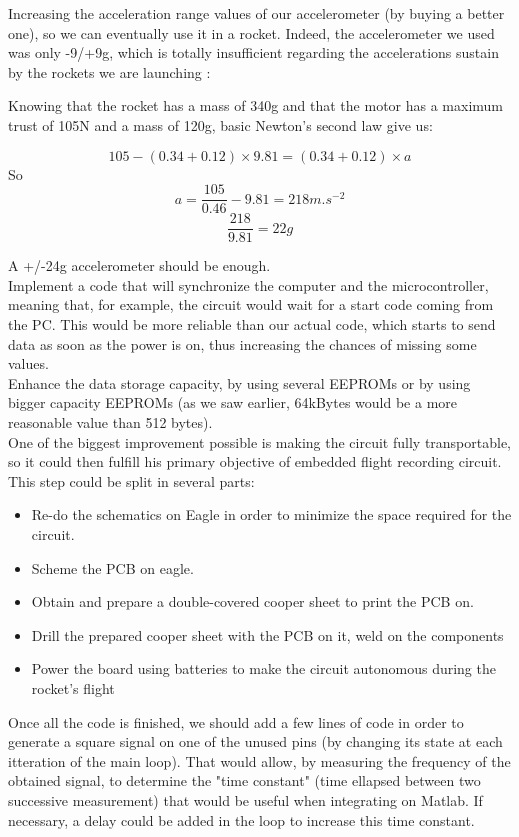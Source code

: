 \documentclass[12pt]{article}
\begin{document}
	Increasing the acceleration range values of our accelerometer (by buying a better one), so we can eventually use it in a rocket. Indeed, the accelerometer we used was only -9/+9g, which is totally insufficient regarding the accelerations sustain by the rockets we are launching :

	Knowing that the rocket has a mass of 340g and that the motor has a maximum trust of 105N and a mass of 120g, basic Newton's second law give us:

	\[105 - (0.34+0.12) \times 9.81 = (0.34+0.12) \times a\]
	So
	\[a = \frac{105}{0.46} - 9.81 = 218 m.s^{-2}\]
	\[\frac{218}{9.81} = 22g\]

	A +/-24g accelerometer should be enough.\\

	Implement a code that will synchronize the computer and the microcontroller, meaning that, for example, the circuit would wait for a start code coming from the PC. This would be more reliable than our actual code, which starts to send data as soon as the power is on, thus increasing the chances of missing some values.\\

	Enhance the data storage capacity, by using several EEPROMs or by using bigger capacity EEPROMs (as we saw earlier, 64kBytes would be a more reasonable value than 512 bytes).\\

	One of the biggest improvement possible is making the circuit fully transportable, so it could then fulfill his primary objective of embedded flight recording circuit. This step could be split in several parts:
	\begin{itemize}
		\item Re-do the schematics on Eagle in order to minimize the space required for the circuit.
		\item Scheme the PCB on eagle.
		\item Obtain and prepare a double-covered cooper sheet to print the PCB on.
		\item Drill the prepared cooper sheet with the PCB on it, weld on the components
		\item Power the board using batteries to make the circuit autonomous during the rocket’s flight 
	\end{itemize}

	Once all the code is finished, we should add a few lines of code in order to generate a square signal on one of the unused pins (by changing its state at each itteration of the main loop). That would allow, by measuring the frequency of the obtained signal, to determine the "time constant" (time ellapsed between two successive measurement) that would be useful when integrating on Matlab. If necessary, a delay could be added in the loop to increase this time constant.\\
\end{document}
